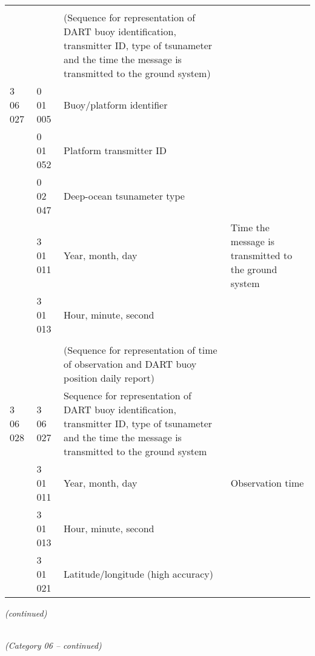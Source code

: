 \begin{longtable}[]{@{}llll@{}}
& & &\tabularnewline
& & (Sequence for representation of DART buoy identification, transmitter ID, type of tsunameter and the time the message is transmitted to the ground system) &\tabularnewline
3 06 027 & 0 01 005 & Buoy/platform identifier &\tabularnewline
& 0 01 052 & Platform transmitter ID &\tabularnewline
& 0 02 047 & Deep-ocean tsunameter type &\tabularnewline
& 3 01 011 & Year, month, day & Time the message is transmitted to the ground system\tabularnewline
& 3 01 013 & Hour, minute, second &\tabularnewline
& & &\tabularnewline
& & (Sequence for representation of time of observation and DART buoy position daily report) &\tabularnewline
3 06 028 & 3 06 027 & Sequence for representation of DART buoy identification, transmitter ID, type of tsunameter and the time the message is transmitted to the ground system &\tabularnewline
& 3 01 011 & Year, month, day & Observation time\tabularnewline
& 3 01 013 & Hour, minute, second &\tabularnewline
& 3 01 021 & Latitude/longitude (high accuracy) &\tabularnewline
\bottomrule
\end{longtable}

\emph{(continued)}

\emph{\\
(Category 06 -- continued)}

